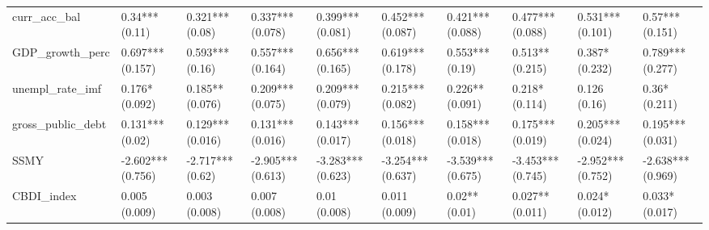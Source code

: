 \begin{table}[ht]
\begin{tabular}{llllllllll}
  curr\_acc\_bal & 0.34*** (0.11) & 0.321*** (0.08) & 0.337*** (0.078) & 0.399*** (0.081) & 0.452*** (0.087) & 0.421*** (0.088) & 0.477*** (0.088) & 0.531*** (0.101) & 0.57*** (0.151) \\ 
  GDP\_growth\_perc & 0.697*** (0.157) & 0.593*** (0.16) & 0.557*** (0.164) & 0.656*** (0.165) & 0.619*** (0.178) & 0.553*** (0.19) & 0.513** (0.215) & 0.387* (0.232) & 0.789*** (0.277) \\ 
  unempl\_rate\_imf & 0.176* (0.092) & 0.185** (0.076) & 0.209*** (0.075) & 0.209*** (0.079) & 0.215*** (0.082) & 0.226** (0.091) & 0.218* (0.114) & 0.126 (0.16) & 0.36* (0.211) \\ 
  gross\_public\_debt & 0.131*** (0.02) & 0.129*** (0.016) & 0.131*** (0.016) & 0.143*** (0.017) & 0.156*** (0.018) & 0.158*** (0.018) & 0.175*** (0.019) & 0.205*** (0.024) & 0.195*** (0.031) \\ 
  SSMY & -2.602*** (0.756) & -2.717*** (0.62) & -2.905*** (0.613) & -3.283*** (0.623) & -3.254*** (0.637) & -3.539*** (0.675) & -3.453*** (0.745) & -2.952*** (0.752) & -2.638*** (0.969) \\ 
  CBDI\_index & 0.005 (0.009) & 0.003 (0.008) & 0.007 (0.008) & 0.01 (0.008) & 0.011 (0.009) & 0.02** (0.01) & 0.027** (0.011) & 0.024* (0.012) & 0.033* (0.017) \\ 
   \bottomrule
\end{tabular}
\endgroup
\end{table}
